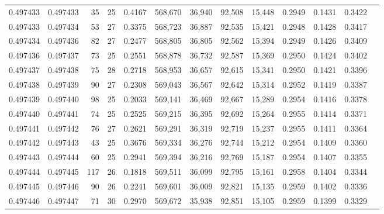 \begin{tabular}{rrrrrrrrrrrrr}
0.497433 & 0.497433 &  35 &  25 &                                     0.4167 & 568,670 &  36,940 &  92,508 &  15,448 & 0.2949 & 0.1431 & 0.3422 \\
0.497433 & 0.497434 &  53 &  27 &                                     0.3375 & 568,723 &  36,887 &  92,535 &  15,421 & 0.2948 & 0.1428 & 0.3417 \\
0.497434 & 0.497436 &  82 &  27 &                                     0.2477 & 568,805 &  36,805 &  92,562 &  15,394 & 0.2949 & 0.1426 & 0.3409 \\
0.497436 & 0.497437 &  73 &  25 &                                     0.2551 & 568,878 &  36,732 &  92,587 &  15,369 & 0.2950 & 0.1424 & 0.3402 \\
0.497437 & 0.497438 &  75 &  28 &                                     0.2718 & 568,953 &  36,657 &  92,615 &  15,341 & 0.2950 & 0.1421 & 0.3396 \\
0.497438 & 0.497439 &  90 &  27 &                                     0.2308 & 569,043 &  36,567 &  92,642 &  15,314 & 0.2952 & 0.1419 & 0.3387 \\
0.497439 & 0.497440 &  98 &  25 &                                     0.2033 & 569,141 &  36,469 &  92,667 &  15,289 & 0.2954 & 0.1416 & 0.3378 \\
0.497440 & 0.497441 &  74 &  25 &                                     0.2525 & 569,215 &  36,395 &  92,692 &  15,264 & 0.2955 & 0.1414 & 0.3371 \\
0.497441 & 0.497442 &  76 &  27 &                                     0.2621 & 569,291 &  36,319 &  92,719 &  15,237 & 0.2955 & 0.1411 & 0.3364 \\
0.497442 & 0.497443 &  43 &  25 &                                     0.3676 & 569,334 &  36,276 &  92,744 &  15,212 & 0.2954 & 0.1409 & 0.3360 \\
0.497443 & 0.497444 &  60 &  25 &                                     0.2941 & 569,394 &  36,216 &  92,769 &  15,187 & 0.2954 & 0.1407 & 0.3355 \\
0.497444 & 0.497445 & 117 &  26 &                                     0.1818 & 569,511 &  36,099 &  92,795 &  15,161 & 0.2958 & 0.1404 & 0.3344 \\
0.497445 & 0.497446 &  90 &  26 &                                     0.2241 & 569,601 &  36,009 &  92,821 &  15,135 & 0.2959 & 0.1402 & 0.3336 \\
0.497446 & 0.497447 &  71 &  30 &                                     0.2970 & 569,672 &  35,938 &  92,851 &  15,105 & 0.2959 & 0.1399 & 0.3329 \\

\end{tabular}
